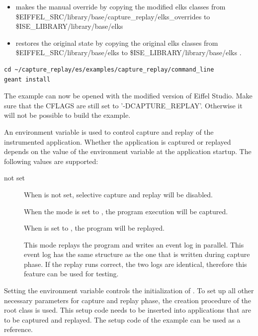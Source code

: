 \begin{itemize}
\item {} makes the manual override by copying the modified elks classes from \$EIFFEL\_SRC/library/base/capture\_replay/elks\_overrides to \$ISE\_LIBRARY/library/base/elks \\
\item {} restores the original state by copying the original elks classes from \$EIFFEL\_SRC/library/base/elks to \$ISE\_LIBRARY/library/base/elks .
\end{itemize}

\begin{lstlisting}
cd ~/capture_replay/es/examples/capture_replay/command_line
geant install
\end{lstlisting}

The example can now be opened with the modified version of Eiffel Studio. Make sure that the CFLAGS are still set to '-DCAPTURE\_REPLAY'. Otherwise it will not be possible to build the example.

An environment variable is used to control capture and replay of the instrumented application. Whether the application is captured or replayed depends on the value of the environment variable  at the application startup. The following values are supported:

\begin{description}
 \item [not set] When  is not set, selective capture and replay will be disabled.
 \item [] When the mode is set to , the program execution will be captured.
 \item [] When  is set to , the program will be replayed.
 \item [] This mode replays the program and writes an event log in parallel. This event log has the same structure as the one that is written during capture phase. If the replay runs correct, the two logs are identical, therefore this feature can be used for testing.
\end{description}

Setting the environment variable controls the initialization of . To set up all other necessary parameters for capture and replay phase, the creation procedure of the root class is used. This setup code needs to be inserted into applications that are to be captured and replayed. The setup code of the example can be used as a reference.

\fussy